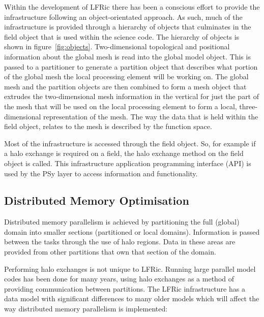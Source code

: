\documentclass[times]{elsarticle}
\begin{document}
Within the development of LFRic there has been a conscious effort to
provide the infrastructure following an object-orientated approach. As
such, much of the infrastructure is provided through a hierarchy of
objects that culminates in the field object that is used within the
science code. The hierarchy of objects is shown in
figure~\ref{fig:objects}. Two-dimensional topological and positional
information about the global mesh is read into the global model object.
This is passed to a partitioner to generate a partition object that
describes what portion of the global mesh the local processing element
will be working on. The global mesh and the partition objects are then
combined to form a mesh object that extrudes the two-dimensional mesh
information in the vertical for just the part of the mesh that will be
used on the local processing element to form a local, three-dimensional
representation of the mesh. The way the data that is held within the
field object, relates to the mesh is described by the function space.

Most of the infrastructure is accessed through the field object. So, for
example if a halo exchange is required on a field, the halo exchange
method on the field object is called. This infrastructure application
programming interface (API) is used by the PSy layer to access
information and functionality.

\subsection{\label{sec:distmem}Distributed Memory Optimisation}

Distributed memory parallelism is achieved by partitioning the full
(global) domain into smaller sections (partitioned or local domains).
Information is passed between the tasks through the use of halo regions.
Data in these areas are provided from other partitions that own that
section of the domain.

Performing halo exchanges is not unique to LFRic. Running large parallel
model codes has been done for many years, using halo exchanges as a
method of providing communication between partitions. The LFRic
infrastructure has a data model with significant differences to many
older models which will affect the way distributed memory parallelism is
implemented:
\end{document}
